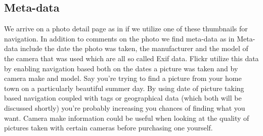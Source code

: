 \subsection{Meta-data}

We arrive on a photo detail page as in
if we utilize one of these thumbnails for navigation. In addition to comments
on the photo we find meta-data as in 
Meta-data include the date the photo was taken, the manufacturer and the model
of the camera that was used which are all so called Exif%
data. Flickr utilize this data by enabling navigation based both on the
dates a picture was taken and by camera make and model. Say you're trying to
find a picture from your home town on a particularly beautiful summer day. By
using date of picture taking based navigation coupled with tags or
geographical data (which both will be discussed shortly) you're probably
increasing you chances of finding what you want. Camera make information could
be useful when looking at the quality of pictures taken with certain cameras
before purchasing one yourself.

